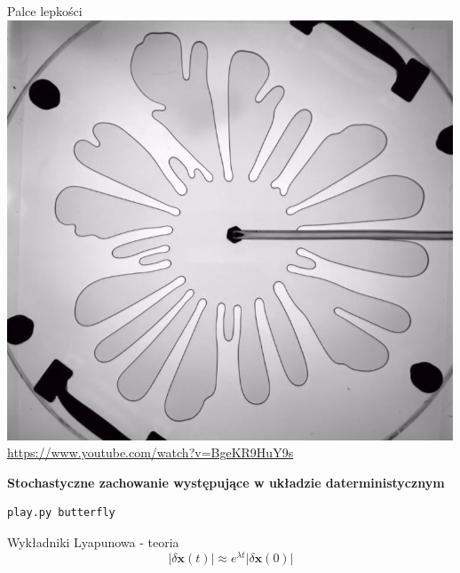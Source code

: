 \documentclass{beamer}
\begin{document}
\begin{frame}{Palce lepkości} \pause
\centering
\includegraphics[height=0.6\textheight]{viscous_fingers}
\url{https://www.youtube.com/watch?v=BgeKR9HuY9s}

\end{frame}

\begin{frame}[fragile]
\textbf{ Stochastyczne zachowanie występujące w układzie daterministycznym}
\begin{lstlisting}
play.py butterfly
\end{lstlisting}
\end{frame}

\begin{frame}[t]{Wykładniki Lyapunowa - teoria}
\begin{equation*}
| \delta\mathbf{x}(t) | \approx e^{\lambda t} | \delta \mathbf{x}(0) |
\end{equation*}
\end{frame}
\end{document}
